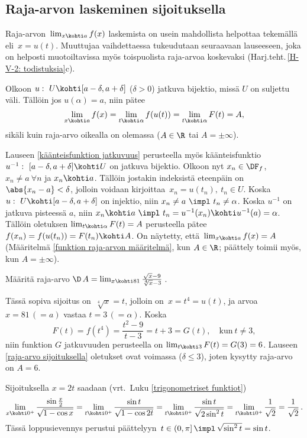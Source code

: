 \subsection{Raja-arvon laskeminen sijoituksella}

Raja-arvon $\,\lim_{x \kohti a} f(x)$ laskemista on usein mahdollista helpottaa tekemällä
 eli  $\,x=u(t)$. Muuttujaa vaihdettaessa tukeudutaan
seuraavaan lauseeseen, joka on helposti muotoiltavissa myös toispuolista raja-arvoa
koskevaksi (Harj.teht.\,\ref{H-V-2: todistuksia}c).
\begin{Lause} \label{raja-arvo sijoituksella} Olkoon $u:\ U\kohti[a-\delta,a+\delta]$ 
($\delta>0$) jatkuva bijektio, missä $U$ on suljettu väli. Tällöin jos $u(\alpha)=a$, niin
pätee
\[
\lim_{x \kohti a} f(x) = \lim_{t\kohti\alpha} f(u(t)) = \lim_{t\kohti\alpha} F(t)=A,
\]
sikäli kuin raja-arvo oikealla on olemassa ($A\in\R$ tai $A=\pm\infty$).
\end{Lause}
\tod Lauseen \ref{käänteisfunktion jatkuvuus} perusteella myös käänteisfunktio
$u^{-1}:\ [a-\delta,a+\delta] \kohti U$ on jatkuva bijektio. Olkoon nyt $x_n\in\DF_f$,
$x_n \neq a\ \forall n$ ja $x_n \kohti a$. Tällöin jostakin indeksistä eteenpäin on 
$\abs{x_n-a}<\delta$, jolloin voidaan kirjoittaa $\,x_n=u(t_n),\ t_n \in U$. Koska
$u:\ U \kohti [a-\delta,a+\delta]$ on injektio, niin $x_n \neq a\ \impl\ t_n\neq\alpha$.
Koska $u^{-1}$ on jatkuva pisteessä $a$, niin 
$x_n \kohti a\ \impl\ t_n=u^{-1}(x_n) \kohti u^{-1}(a)=\alpha$. Tällöin oletuksen
$\lim_{t\kohti\alpha} F(t)=A$ perusteella pätee $f(x_n)=f(u(t_n))=F(t_n) \kohti A$. On näytetty,
että $\,\lim_{x \kohti a} f(x)=A$ (Määritelmä \ref{funktion raja-arvon määritelmä},
kun $A\in\R$; päättely toimii myös, kun $A=\pm\infty$). \loppu

\begin{Exa} \label{raja-arvo muuttujan vaihdolla} Määritä raja-arvo
$\D \,A=\lim_{x \kohti 81} \frac{\sqrt{x}-9}{\sqrt[4]{x}-3}\,$.
\end{Exa}
\ratk Tässä sopiva sijoitus on $\,\sqrt[4]{x}=t$, jolloin on $\,x=t^4=u(t)$, ja arvoa
$x=81\,(=a)$ vastaa $t=3\,(=\alpha)$. Koska
\[
F(t)=f(t^4)=\frac{t^2-9}{t-3}=t+3=G(t), \quad \text{kun}\ t \neq 3,
\]
niin funktion $G$ jatkuvuuden perusteella on $\lim_{t \kohti 3} F(t)=G(3)=6$. Lauseen
\ref{raja-arvo sijoituksella} oletukset ovat voimassa ($\delta \le 3$), joten kysytty
raja-arvo on $A=6$. \loppu
\begin{Exa} Sijoituksella $x=2t$ saadaan (vrt.\ Luku \ref{trigonometriset funktiot})
\[
\lim_{x \kohti 0^+} \frac{\sin\frac{x}{2}}{\sqrt{1-\cos x}}
  = \lim_{t \kohti 0^+} \frac{\sin t}{\sqrt{1-\cos 2t}}
  = \lim_{t \kohti 0^+} \frac{\sin t}{\sqrt{2\sin^2 t}}
  = \lim_{t \kohti 0^+} \frac{1}{\sqrt{2}} 
  = \frac{1}{\sqrt{2}}\,.
\]
Tässä loppusievennys perustui päättelyyn
$\,t\in(0,\pi]\,\impl\,\sqrt{\sin^2 t}=\sin t$. \loppu
\end{Exa}

